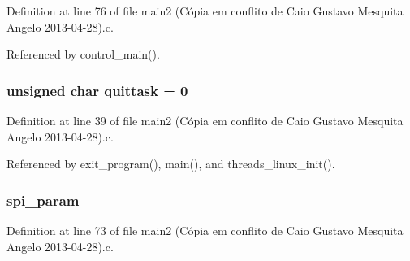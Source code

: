 Definition at line 76 of file main2 (\-Cópia em conflito de Caio Gustavo Mesquita Angelo 2013-\/04-\/28).\-c.



Referenced by control\-\_\-main().

\hypertarget{main2_01_07C_xC3_xB3pia_01em_01conflito_01de_01Caio_01Gustavo_01Mesquita_01Angelo_012013-04-28_08_8c_a525dcecf4685bea1fbf92651ac0401fe}{
\subsubsection[{quittask}]{\setlength{\rightskip}{0pt plus 5cm}unsigned char quittask = 0}}\label{main2_01_07C_xC3_xB3pia_01em_01conflito_01de_01Caio_01Gustavo_01Mesquita_01Angelo_012013-04-28_08_8c_a525dcecf4685bea1fbf92651ac0401fe}


Definition at line 39 of file main2 (\-Cópia em conflito de Caio Gustavo Mesquita Angelo 2013-\/04-\/28).\-c.



Referenced by exit\-\_\-program(), main(), and threads\-\_\-linux\-\_\-init().

\hypertarget{main2_01_07C_xC3_xB3pia_01em_01conflito_01de_01Caio_01Gustavo_01Mesquita_01Angelo_012013-04-28_08_8c_adec2468b88cf50b20e5cf399a3b7e994}{
\subsubsection[{spi\-\_\-param}]{ spi\-\_\-param}}\label{main2_01_07C_xC3_xB3pia_01em_01conflito_01de_01Caio_01Gustavo_01Mesquita_01Angelo_012013-04-28_08_8c_adec2468b88cf50b20e5cf399a3b7e994}


Definition at line 73 of file main2 (\-Cópia em conflito de Caio Gustavo Mesquita Angelo 2013-\/04-\/28).\-c.




